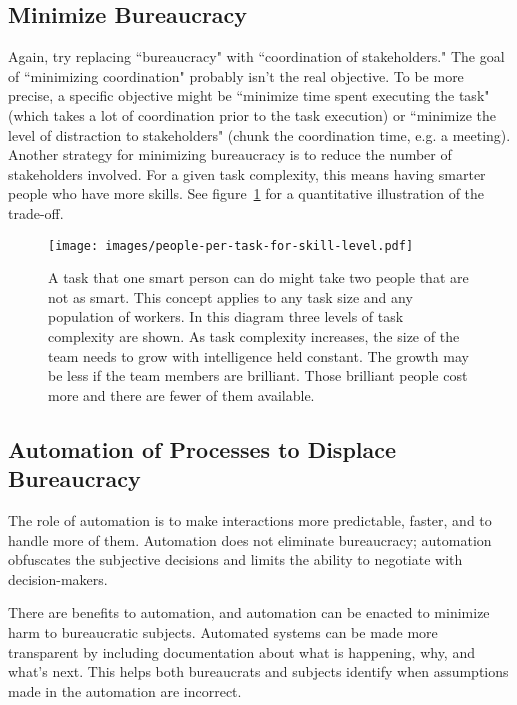 \subsection*{Minimize Bureaucracy}
Again, try replacing ``bureaucracy" with ``coordination of stakeholders." The goal of ``minimizing coordination" probably isn't the real objective. To be more precise, a specific objective might be ``minimize time spent executing the task" (which takes a lot of coordination prior to the task execution) or ``minimize the level of distraction to stakeholders" (chunk the coordination time, e.g. a meeting). Another strategy for minimizing bureaucracy is to reduce the number of stakeholders involved. For a given task complexity, this means having smarter people who have more skills. See figure~\ref{fig:complexity-and-size} for a quantitative illustration of the trade-off. 


\begin{figure}
\centering
\texttt{[image: images/people-per-task-for-skill-level.pdf]}
\caption{A task that one smart person can do might take two  people that are not as smart. This concept applies to any task size and any population of workers. In this diagram three levels of task complexity are shown. As task complexity increases, the size of the team needs to grow with intelligence held constant. The growth may be less if the team members are brilliant. Those brilliant people cost more and there are fewer of them available.}
\label{fig:complexity-and-size}
\end{figure}


\subsection*{Automation of Processes to Displace Bureaucracy\label{sec:automation}}

The role of automation is to make interactions more predictable, faster, and to handle more of them. Automation does not eliminate bureaucracy; automation obfuscates the subjective decisions and limits the ability to negotiate with decision-makers.

There are benefits to automation, and automation can be enacted to minimize harm to bureaucratic subjects.  Automated systems can be made more transparent by including documentation about what is happening, why, and what's next.
This helps both bureaucrats and subjects identify when assumptions made in the automation are incorrect. 


